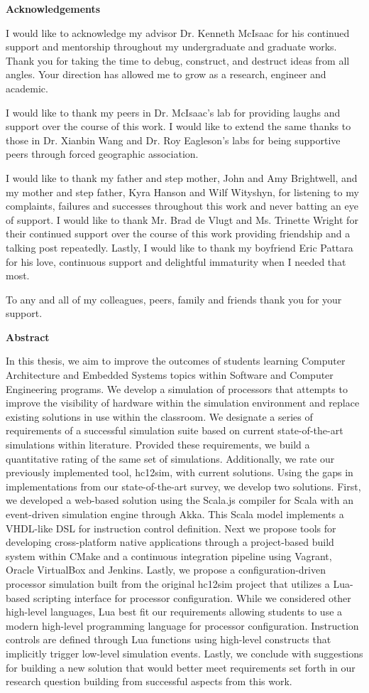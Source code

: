 \documentclass[12pt, twoside, final]{report}
\numberwithin{figure}{chapter}
\newenvironment{preliminary}%
{\pagestyle{plain}\pagenumbering{roman}}%
{\pagenumbering{arabic}}
\newcommand{\makecoauthor}{

}
\newcommand{\makeacknowlege}{%

I would like to acknowledge my advisor Dr. Kenneth McIsaac for his continued support and mentorship throughout my undergraduate and graduate works. Thank you for taking the time to debug, construct, and destruct ideas from all angles. Your direction has allowed me to grow as a research, engineer and academic. 

I would like to thank my peers in Dr. McIsaac's lab for providing laughs and support over the course of this work. I would like to extend the same thanks to those in Dr. Xianbin Wang and Dr. Roy Eagleson's labs for being supportive peers through forced geographic association.  

I would like to thank my father and step mother, John and Amy Brightwell, and my mother and step father, Kyra Hanson and Wilf Wityshyn, for listening to my complaints, failures and successes throughout this work and never batting an eye of support. I would like to thank Mr. Brad de Vlugt and Ms. Trinette Wright for their continued support over the course of this work providing friendship and a talking post repeatedly. Lastly, I would like to thank my boyfriend Eric Pattara for his love, continuous support and delightful immaturity when I needed that most. 

To any and all of my colleagues, peers, family and friends thank you for your support.
}
\begin{document}
\begin{preliminary}
\begin{spacing}{1.5}

{}
{}
\Large\begin{center}\textbf{Acknowledgements}\end{center}\normalsize
\makeacknowlege
\clearpage 

{}
\Large\begin{center}\textbf{Abstract}\end{center}\normalsize

In this thesis, we aim to improve the outcomes of students learning Computer Architecture and Embedded Systems topics within Software and Computer Engineering programs. We develop a simulation of processors that attempts to improve the visibility of hardware within the simulation environment and replace existing solutions in use within the classroom. We designate a series of requirements of a successful simulation suite based on current state-of-the-art simulations within literature. Provided these requirements, we build a quantitative rating of  the same set of simulations. Additionally, we rate our previously implemented tool, hc12sim, with current solutions. Using the gaps in implementations from our state-of-the-art survey, we develop two solutions. First, we developed a web-based solution using the Scala.js compiler for Scala with an event-driven simulation engine through Akka. This Scala model implements a VHDL-like DSL for instruction control definition. Next we propose tools for developing cross-platform native applications through a project-based build system within CMake and a continuous integration pipeline using Vagrant, Oracle VirtualBox and Jenkins. Lastly, we propose a configuration-driven processor simulation built from the original hc12sim project that utilizes a Lua-based scripting interface for processor configuration. While we considered other high-level languages, Lua best fit our requirements allowing students to use a modern high-level programming language for processor configuration. Instruction controls are defined through Lua functions using high-level constructs that implicitly trigger low-level simulation events. Lastly, we conclude with suggestions for building a new solution that would better meet requirements set forth in our research question building from successful aspects from this work. 


\end{spacing}
\end{preliminary}
\end{document}
